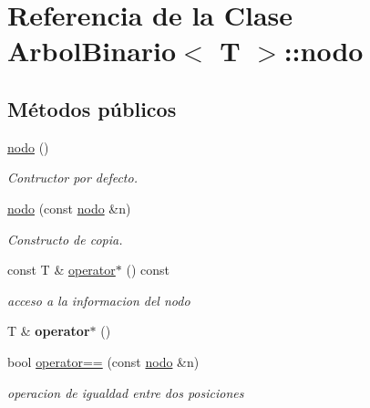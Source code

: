 \hypertarget{classArbolBinario_1_1nodo}{}\section{Referencia de la Clase Arbol\+Binario$<$ T $>$\+:\+:nodo}
\label{classArbolBinario_1_1nodo}
\subsection*{Métodos públicos}
\begin{DoxyCompactItemize}
\item 
\mbox{\label{classArbolBinario_1_1nodo_ac714bbecdf111e68b7725b44048e0d02}} 
\hyperlink{classArbolBinario_1_1nodo_ac714bbecdf111e68b7725b44048e0d02}{nodo} ()
\begin{DoxyCompactList}\small\item\em Contructor por defecto. \end{DoxyCompactList}\item 
\hyperlink{classArbolBinario_1_1nodo_ab73087719276b298b3801c772da82fdf}{nodo} (const \hyperlink{classArbolBinario_1_1nodo}{nodo} \&n)
\begin{DoxyCompactList}\small\item\em Constructo de copia. \end{DoxyCompactList}\item 
\mbox{\label{classArbolBinario_1_1nodo_a99010585e481f5f8172fbcf42e39827b}} 
const T \& \hyperlink{classArbolBinario_1_1nodo_a99010585e481f5f8172fbcf42e39827b}{operator$\ast$} () const
\begin{DoxyCompactList}\small\item\em acceso a la informacion del nodo \end{DoxyCompactList}\item 
\mbox{\label{classArbolBinario_1_1nodo_a1438c24ae9ccbd9b8eab6e632c52e702}} 
T \& {\bfseries operator$\ast$} ()
\item 
bool \hyperlink{classArbolBinario_1_1nodo_a02dfaed2a589195911bc8e75bd97d298}{operator==} (const \hyperlink{classArbolBinario_1_1nodo}{nodo} \&n)
\begin{DoxyCompactList}\small\item\em operacion de igualdad entre dos posiciones \end{DoxyCompactList}\item 

\end{DoxyCompactItemize}
